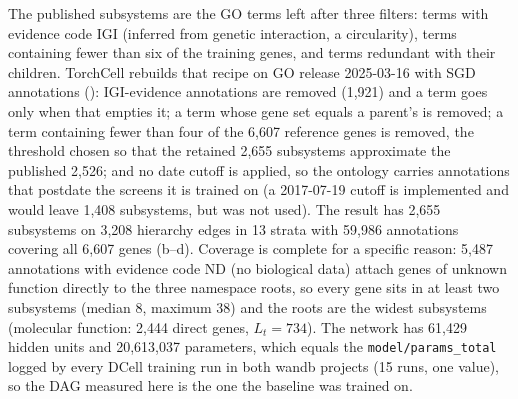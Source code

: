  The published subsystems are the GO terms
left after three filters: terms with evidence code IGI (inferred from genetic interaction, a
circularity), terms containing fewer than six of the training genes, and terms redundant
with their children. TorchCell rebuilds that recipe on GO release 2025-03-16 with SGD
annotations (): IGI-evidence annotations are removed (1,921) and
a term goes only when that empties it; a term whose gene set equals a parent's is removed;
a term containing fewer than four of the 6,607 reference genes is removed, the threshold
chosen so that the retained 2,655 subsystems approximate the published 2,526; and no date
cutoff is applied, so the ontology carries annotations that postdate the screens it is
trained on (a 2017-07-19 cutoff is implemented and would leave 1,408 subsystems, but was not
used). The result has 2,655 subsystems on 3,208 hierarchy edges in 13 strata with 59,986
annotations covering all 6,607 genes (b--d). Coverage is complete
for a specific reason: 5,487 annotations with evidence code ND (no biological data) attach
genes of unknown function directly to the three namespace roots, so every gene sits in at
least two subsystems (median 8, maximum 38) and the roots are the widest subsystems
(molecular function: 2,444 direct genes, $L_t=734$). The network has 61,429 hidden units and
20,613,037 parameters, which equals the \texttt{model/params\_total} logged by every DCell
training run in both wandb projects (15 runs, one value), so the DAG measured here is the
one the baseline was trained on.

